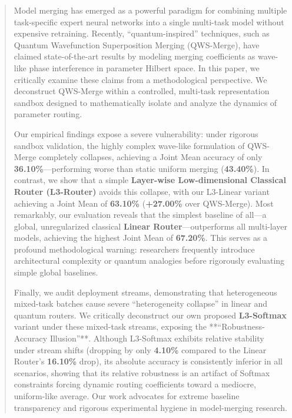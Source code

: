 \begin{abstract}
Model merging has emerged as a powerful paradigm for combining multiple task-specific expert neural networks into a single multi-task model without expensive retraining. Recently, ``quantum-inspired'' techniques, such as Quantum Wavefunction Superposition Merging (QWS-Merge), have claimed state-of-the-art results by modeling merging coefficients as wave-like phase interference in parameter Hilbert space. In this paper, we critically examine these claims from a methodological perspective. We deconstruct QWS-Merge within a controlled, multi-task representation sandbox designed to mathematically isolate and analyze the dynamics of parameter routing. 

Our empirical findings expose a severe vulnerability: under rigorous sandbox validation, the highly complex wave-like formulation of QWS-Merge completely collapses, achieving a Joint Mean accuracy of only \textbf{36.10\%}—performing worse than static uniform merging (\textbf{43.40\%}). In contrast, we show that a simple \textbf{Layer-wise Low-dimensional Classical Router (L3-Router)} avoids this collapse, with our L3-Linear variant achieving a Joint Mean of \textbf{63.10\%} (\textbf{+27.00\%} over QWS-Merge). Most remarkably, our evaluation reveals that the simplest baseline of all—a global, unregularized classical \textbf{Linear Router}—outperforms all multi-layer models, achieving the highest Joint Mean of \textbf{67.20\%}. This serves as a profound methodological warning: researchers frequently introduce architectural complexity or quantum analogies before rigorously evaluating simple global baselines. 

Finally, we audit deployment streams, demonstrating that heterogeneous mixed-task batches cause severe ``heterogeneity collapse'' in linear and quantum routers. We critically deconstruct our own proposed \textbf{L3-Softmax} variant under these mixed-task streams, exposing the **``Robustness-Accuracy Illusion''**. Although L3-Softmax exhibits relative stability under stream shifts (dropping by only \textbf{4.10\%} compared to the Linear Router's \textbf{16.10\%} drop), its absolute accuracy is consistently inferior in all scenarios, showing that its relative robustness is an artifact of Softmax constraints forcing dynamic routing coefficients toward a mediocre, uniform-like average. Our work advocates for extreme baseline transparency and rigorous experimental hygiene in model-merging research.
\end{abstract}

